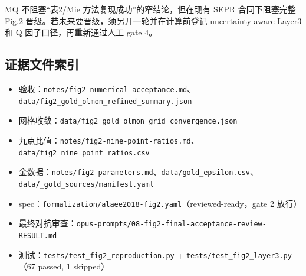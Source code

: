 MQ 不阻塞“表2/Mie 方法复现成功”的窄结论，但在现有 SEPR 合同下阻塞完整 Fig.2 晋级。若未来要晋级，须另开一轮并在计算前登记 uncertainty-aware Layer3 和 Q 因子口径，再重新通过人工 gate 4。

\subsection{证据文件索引}

\begin{itemize}
  \footnotesize
  \raggedright
  \setlength{\itemsep}{0.15em}
  \setlength{\parsep}{0pt}
  \setlength{\parskip}{0pt}
  \item 验收：\texttt{notes/fig2-numerical-acceptance.md}、\texttt{data/fig2\_gold\_olmon\_refined\_summary.json}
  \item 网格收敛：\texttt{data/fig2\_gold\_olmon\_grid\_convergence.json}
  \item 九点比值：\texttt{notes/fig2-nine-point-ratios.md}、\texttt{data/fig2\_nine\_point\_ratios.csv}
  \item 金数据：\texttt{notes/fig2-parameters.md}、\texttt{data/gold\_epsilon.csv}、\texttt{data/\_gold\_sources/manifest.yaml}
  \item spec：\texttt{formalization/alaee2018-fig2.yaml}（reviewed-ready，gate 2 放行）
  \item 最终对抗审查：\texttt{opus-prompts/08-fig2-final-acceptance-review-RESULT.md}
  \item 测试：\texttt{tests/test\_fig2\_reproduction.py} + \texttt{tests/test\_fig2\_layer3.py}（67 passed, 1 skipped）
\end{itemize}
